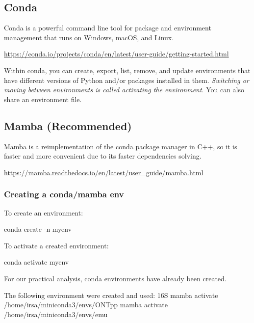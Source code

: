 \documentclass[
]{book}
\newenvironment{Shaded}{\begin{snugshade}}{\end{snugshade}}
\newcommand{\AttributeTok}[1]{\textcolor[rgb]{0.13,0.29,0.53}{#1}}
\newcommand{\ExtensionTok}[1]{#1}
\newcommand{\NormalTok}[1]{#1}
\begin{document}
\subsection{Conda}\label{conda}

Conda is a powerful command line tool for package and environment management that runs on Windows, macOS, and Linux.

\url{https://conda.io/projects/conda/en/latest/user-guide/getting-started.html}

Within conda, you can create, export, list, remove, and update environments that have different versions of Python and/or packages installed in them. \emph{Switching or moving between environments is called activating the environment}. You can also share an environment file.

\subsection{Mamba (Recommended)}\label{mamba-recommended}

Mamba is a reimplementation of the conda package manager in C++, so it is faster and more convenient due to its faster dependencies solving.

\url{https://mamba.readthedocs.io/en/latest/user_guide/mamba.html}

\subsubsection{Creating a conda/mamba env}\label{creating-a-condamamba-env}

To create an environment:

\begin{Shaded}
\begin{Highlighting}[]
\ExtensionTok{conda}\NormalTok{ create }\AttributeTok{{-}n}\NormalTok{ myenv}
\end{Highlighting}
\end{Shaded}

To activate a created environment:

\begin{Shaded}
\begin{Highlighting}[]
\ExtensionTok{conda}\NormalTok{ activate myenv}
\end{Highlighting}
\end{Shaded}

For our practical analysis, conda environments have already been created.

The following environment were created and used:
16S
mamba activate /home/irsa/miniconda3/envs/ONTpp
mamba activate /home/irsa/miniconda3/envs/emu
\end{document}
